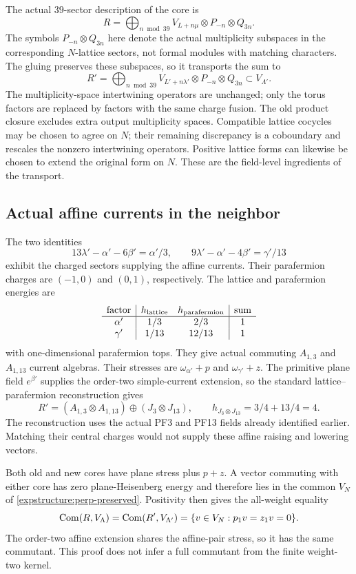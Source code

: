 The actual $39$-sector description of the core is
\[
 R=\bigoplus_{n\bmod39}
     V_{L+n\mu}\otimes P_{-n}\otimes Q_{3n}.
\]
The symbols $P_{-n}\otimes Q_{3n}$ here denote the actual
multiplicity subspaces in the corresponding $N$-lattice sectors,
not formal modules with matching characters. The gluing preserves
these subspaces, so it transports the sum to
\[
 R'=\bigoplus_{n\bmod39}
     V_{L'+n\lambda'}\otimes P_{-n}\otimes Q_{3n}
     \subset V_{\Lambda'}.
\]
The multiplicity-space intertwining operators are unchanged; only
the torus factors are replaced by factors with the same charge
fusion. The old product closure excludes extra output multiplicity
spaces. Compatible lattice cocycles may be chosen to agree on
$N$; their remaining discrepancy is a coboundary and rescales the
nonzero intertwining operators. Positive lattice forms can likewise
be chosen to extend the original form on $N$. These are the
field-level ingredients of the transport.

\subsection{Actual affine currents in the neighbor}

The two identities
\[
 13\lambda'-\alpha'-6\beta'=\alpha'/3,
 \qquad
 9\lambda'-\alpha'-4\beta'=\gamma'/13
\]
exhibit the charged sectors supplying the affine currents. Their
parafermion charges are $(-1,0)$ and $(0,1)$, respectively.
The lattice and parafermion energies are
\[
\begin{array}{c|cc|c}
\text{factor}&h_{\rm lattice}&h_{\rm parafermion}&\text{sum}\\\hline
\alpha'&1/3&2/3&1\\
\gamma'&1/13&12/13&1
\end{array}
\]
with one-dimensional parafermion tops. They give actual commuting
$A_{1,3}$ and $A_{1,13}$ current algebras. Their stresses are
$\omega_{\alpha'}+p$ and $\omega_{\gamma'}+z$.
The primitive plane field $e^{\beta'}$ supplies the order-two
simple-current extension, so the standard lattice--parafermion
reconstruction gives
\[
 R'=(A_{1,3}\otimes A_{1,13})
       \oplus(J_3\otimes J_{13}),
 \qquad h_{J_3\otimes J_{13}}=3/4+13/4=4.
\]
The reconstruction uses the actual PF3 and PF13 fields already
identified earlier. Matching their central charges would not supply
these affine raising and lowering vectors.

Both old and new cores have plane stress plus $p+z$. A vector
commuting with either core has zero plane-Heisenberg energy and
therefore lies in the common $V_N$ of
\eqref{expstructure:perp-preserved}. Positivity then gives the
all-weight equality
\[
 \operatorname{Com}(R,V_\Lambda)=\operatorname{Com}(R',V_{\Lambda'})
 =\{v\in V_N:p_1v=z_1v=0\}.
\]
The order-two affine extension shares the affine-pair stress, so
it has the same commutant. This proof does not infer a full
commutant from the finite weight-two kernel.

